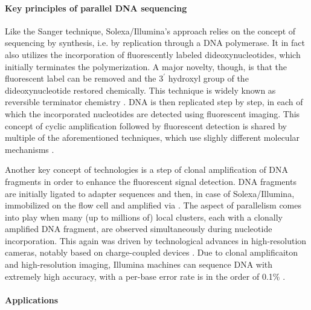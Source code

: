 \paragraph{Key principles of parallel DNA sequencing}
Like the Sanger technique, Solexa/Illumina’s approach relies on the concept of
sequencing by synthesis, i.e. by replication through a DNA polymerase. It in
fact also utilizes the incorporation of fluorescently labeled dideoxynucleotides,
which initially terminates the polymerization. A major novelty, though, is that
the fluorescent label can be removed and the $3^\prime$ hydroxyl group of the
dideoxynucleotide restored chemically. This technique is widely known as
reversible terminator chemistry \citep{Turcatti2008}. DNA is then replicated
step by step, in each of which the incorporated nucleotides are detected using
fluorescent imaging. This concept of cyclic amplification followed by
fluorescent detection is shared by multiple of the aforementioned techniques,
which use slighly different molecular mechanisms \citep{Shendure2008}.

Another key concept of \mps technologies is a step of clonal amplification of
DNA fragments in order to enhance the fluorescent signal detection. DNA
fragments are initially ligated to adapter sequences and then, in case of
Solexa/Illumina, immobilized on the flow cell and amplified via
    \citep{Mullis1990}.
The aspect of parallelism comes into play when many (up to millions of) local
clusters, each with a clonally amplified DNA fragment, are observed
simultaneously during nucleotide incorporation. This again was driven by
technological advances in high-resolution cameras, notably based on
charge-coupled devices \citep{Barbe1975,Shendure2008}. Due to clonal
amplificaiton and high-resolution imaging, Illumina machines can sequence DNA
with extremely high accuracy, with a per-base error rate is in the order
of 0.1\% \citep{Fox2014}.

\paragraph{Applications}



